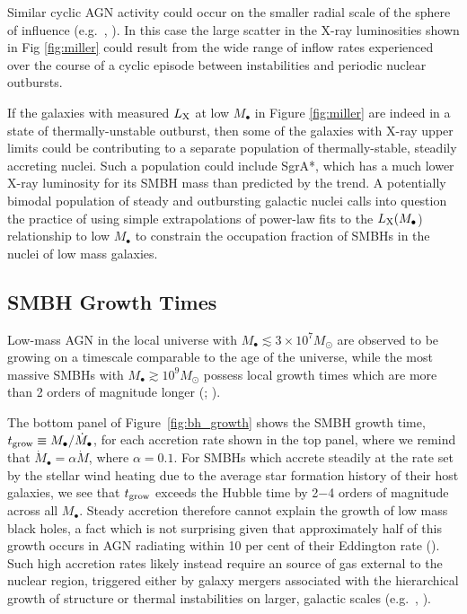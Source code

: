 \documentclass[usenatbib,fleqn]{mn2e}
\begin{document}
Similar cyclic AGN activity could occur on the smaller radial scale of
the sphere of influence (e.g.~\citealt{Yuan&Li11},
\citealt{Cuadra+15}).  In this case the large scatter in the X-ray
luminosities shown in Fig \ref{fig:miller} could result from the wide
range of inflow rates experienced over the course of a cyclic episode
between instabilities and periodic nuclear outbursts. 

If the galaxies with measured $L_{\rm X}$ at low $M_{\bullet}$
in Figure \ref{fig:miller} are indeed in a state of thermally-unstable
outburst, then some of the galaxies with X-ray upper limits could be contributing to a separate population of thermally-stable, steadily accreting nuclei.  Such a population could include SgrA*, which has a much lower X-ray luminosity for its SMBH mass than predicted by the \citet{Miller+15} trend.  A potentially bimodal population of steady and outbursting galactic nuclei calls into question the practice of using simple extrapolations of power-law fits to the $L_{\rm X}(M_{\bullet}$) relationship to low $M_{\bullet}$ to constrain the occupation fraction of SMBHs in the nuclei of low mass
galaxies.



\subsection{SMBH Growth Times }
\label{sec:growth}

Low-mass AGN in the local universe with $M_{\bullet} \lesssim 3\times
10^{7}M_{\odot}$ are observed to be growing on a timescale comparable
to the age of the universe, while the most massive SMBHs with
$M_{\bullet} \gtrsim 10^{9}M_{\odot}$ possess local growth times which
are more than 2 orders of magnitude longer (\citealt{Heckman+04};
\citealt{Kauffmann&Heckman09}).

The bottom panel of Figure~\ref{fig:bh_growth} shows the SMBH growth
time, $t_{\rm grow} \equiv M_{\bullet}/\dot{M}_{\bullet}$, for each accretion
rate shown in the top panel, where we remind that $\dot{M}_{\bullet} = \alpha\dot{M}$, where $\alpha = 0.1$.  For SMBHs which accrete steadily at the
rate set by the stellar wind heating due to the average star formation
history of their host galaxies, we see that $t_{\rm grow}$ exceeds the
Hubble time by 2$-$4 orders of magnitude across all $M_{\bullet}$.
Steady accretion therefore cannot explain the growth of low mass black
holes, a fact which is not surprising given that approximately half of
this growth occurs in AGN radiating within 10 per cent of their
Eddington rate (\citealt{Heckman+04}).  Such high accretion rates
likely instead require an source of gas external to the nuclear
region, triggered either by galaxy mergers associated with the
hierarchical growth of structure or thermal instabilities on larger,
galactic scales (e.g.~\citealt{Ciotti+10}, \citealt{Voit+15}).  
\end{document}
